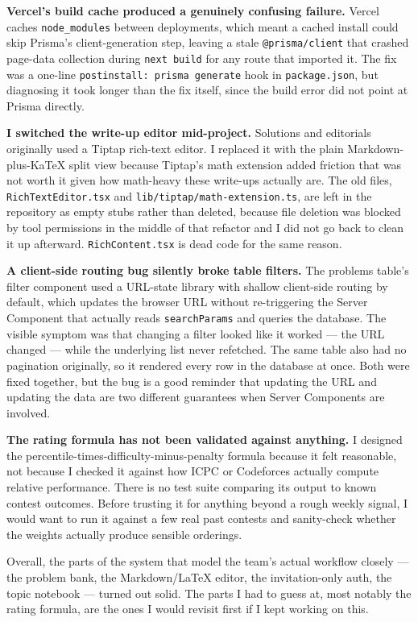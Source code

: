 \documentclass[11pt]{article}
\begin{document}
\textbf{Vercel's build cache produced a genuinely confusing failure.} Vercel caches \texttt{node\_modules} between deployments, which meant a cached install could skip Prisma's client-generation step, leaving a stale \texttt{@prisma/client} that crashed page-data collection during \texttt{next build} for any route that imported it. The fix was a one-line \texttt{postinstall: prisma generate} hook in \texttt{package.json}, but diagnosing it took longer than the fix itself, since the build error did not point at Prisma directly.

\textbf{I switched the write-up editor mid-project.} Solutions and editorials originally used a Tiptap rich-text editor. I replaced it with the plain Markdown-plus-KaTeX split view because Tiptap's math extension added friction that was not worth it given how math-heavy these write-ups actually are. The old files, \texttt{RichTextEditor.tsx} and \texttt{lib/tiptap/math-extension.ts}, are left in the repository as empty stubs rather than deleted, because file deletion was blocked by tool permissions in the middle of that refactor and I did not go back to clean it up afterward. \texttt{RichContent.tsx} is dead code for the same reason.

\textbf{A client-side routing bug silently broke table filters.} The problems table's filter component used a URL-state library with shallow client-side routing by default, which updates the browser URL without re-triggering the Server Component that actually reads \texttt{searchParams} and queries the database. The visible symptom was that changing a filter looked like it worked --- the URL changed --- while the underlying list never refetched. The same table also had no pagination originally, so it rendered every row in the database at once. Both were fixed together, but the bug is a good reminder that updating the URL and updating the data are two different guarantees when Server Components are involved.

\textbf{The rating formula has not been validated against anything.} I designed the percentile-times-difficulty-minus-penalty formula because it felt reasonable, not because I checked it against how ICPC or Codeforces actually compute relative performance. There is no test suite comparing its output to known contest outcomes. Before trusting it for anything beyond a rough weekly signal, I would want to run it against a few real past contests and sanity-check whether the weights actually produce sensible orderings.

Overall, the parts of the system that model the team's actual workflow closely --- the problem bank, the Markdown/LaTeX editor, the invitation-only auth, the topic notebook --- turned out solid. The parts I had to guess at, most notably the rating formula, are the ones I would revisit first if I kept working on this.
\end{document}
